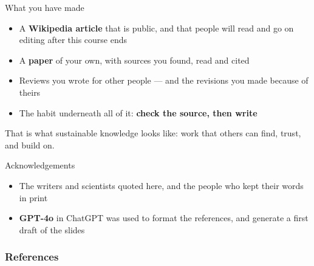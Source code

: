 \documentclass[aspectratio=169]{beamer}
\begin{document}
\begin{frame}{What you have made}
\begin{itemize}
  \item A \textbf{Wikipedia article} that is public, and that people will
    read and go on editing after this course ends
  \item A \textbf{paper} of your own, with sources you found, read and cited
  \item Reviews you wrote for other people --- and the revisions you made
    because of theirs
  \item The habit underneath all of it: \textbf{check the source, then write}
\end{itemize}
\vspace{2ex}
That is what sustainable knowledge looks like: work that others can find,
trust, and build on.
\end{frame}

\begin{frame}{Acknowledgements}
\small
\begin{itemize}
  \item The writers and scientists quoted here, and the people who kept
    their words in print
  \item \textbf{GPT-4o} in ChatGPT \citep{openai-chatgpt-2025-03-14} was used to format the
    references, and generate a first draft of the slides
  \aicheck
\end{itemize}
\end{frame}

\begin{frame}[allowframebreaks]
\frametitle{References}
\printbibliography[heading=none]
\end{frame}
\end{document}
